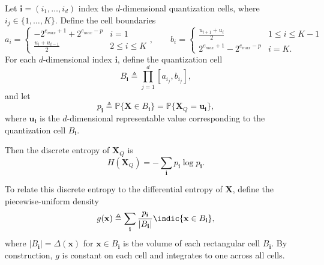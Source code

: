 \documentclass[12pt,onecolumn, margin=1in]{IEEEtran}
\begin{document}
Let $\mathbf{i} = (i_1,\dots,i_d)$ index the $d$-dimensional quantization cells, where $i_j \in \{1,\dots,K\}$. Define the cell boundaries
\begin{equation}
a_i=\begin{cases}
-2^{e_{max} + 1} + 2^{e_{max} - p} & i=1\\[2pt]
\frac{u_i+u_{i-1}}2 & 2\leq i\leq K
\end{cases},
\qquad
b_i=\begin{cases}
\frac{u_{i+1}+u_i}2 & 1\leq i\leq K-1\\[2pt]
2^{e_{max} + 1} - 2^{e_{max} - p} & i=K.
\end{cases}
\end{equation}
For each $d$-dimensional index $\mathbf{i}$, define the quantization cell
\begin{equation}
B_{\mathbf{i}} \triangleq \prod_{j=1}^d [a_{i_j}, b_{i_j}],
\end{equation}
and let
\begin{equation}
p_{\mathbf{i}} \triangleq \mathbb{P}\{\mathbf{X}\in B_{\mathbf{i}}\}
= \mathbb{P}\{\mathbf{X}_Q = \mathbf{u}_{\mathbf{i}}\},
\end{equation}
where $\mathbf{u}_{\mathbf{i}}$ is the $d$-dimensional representable value corresponding to the quantization cell $B_\mathbf{i}$.

Then the discrete entropy of $\mathbf{X}_Q$ is
\begin{equation}
H(\mathbf{X}_Q) = -\sum_{\mathbf{i}} p_{\mathbf{i}} \log p_{\mathbf{i}}.
\end{equation}

To relate this discrete entropy to the differential entropy of $\mathbf{X}$, define the piecewise-uniform density
\begin{equation}
g(\mathbf{x})
\triangleq
\sum_{\mathbf{i}}
\frac{p_{\mathbf{i}}}{|B_{\mathbf{i}}|}
\indic{\mathbf{x}\in B_{\mathbf{i}}},
\label{eq:piecewise_uniform_g}
\end{equation}
where $|B_{\mathbf{i}}| = \Delta(\mathbf{x})$ for $\mathbf{x} \in B_{\mathbf{i}}$ is the volume of each rectangular cell $B_{\mathbf{i}}$. By construction, $g$ is constant on each cell and integrates to one across all cells.
\end{document}
